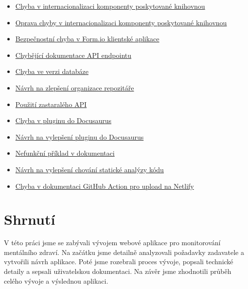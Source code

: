 \begin{itemize}
    \item
    \href{https://github.com/formio/react/issues/522}{Chyba v internacionalizaci komponenty poskytované knihovnou}
    \item
    \href{https://github.com/formio/react/pull/538}{Oprava chyby v internacionalizaci komponenty poskytované knihovnou}
    \item
    \href{https://github.com/formio/formio-app-formio/issues/35}{Bezpečnostní chyba v Form.io klientské aplikace}
    \item
    \href{https://github.com/formio/formio/issues/1555}{Chybějící dokumentace API endpointu}
    \item
    \href{https://github.com/formio/formio/issues/1485}{Chyba ve verzi databáze}
    \item
    \href{https://github.com/formio/formio-app-formio/issues/34}{Návrh na zlepšení organizace repozitáře}
    \item
    \href{https://github.com/formio/react/issues/523}{Použití zastaralého API}
    \item
    \href{https://github.com/tgreyuk/typedoc-plugin-markdown/issues/429}{Chyba v pluginu do Docusaurus}
    \item
    \href{https://github.com/tgreyuk/typedoc-plugin-markdown/issues/440}{Návrh na vylepšení pluginu do Docusaurus}
    \item
    \href{https://github.com/react-bootstrap/react-bootstrap/issues/6671}{Nefunkční příklad v dokumentaci}
    \item
    \href{https://github.com/gajus/eslint-plugin-jsdoc/issues/1138}{Návrh na vylepšení chování statické analýzy kódu}
    \item
    \href{https://github.com/MrFlynn/upload-to-netlify-action/issues/17}{Chyba v dokumentaci GitHub Action pro upload na Netlify}
\end{itemize}


\section{Shrnutí}\label{sec:shrnuti}

V této práci jsme se zabývali vývojem webové aplikace pro monitorování mentálního zdraví.
Na začátku jsme detailně analyzovali požadavky zadavatele a vytvořili návrh aplikace.
Poté jsme rozebrali proces vývoje, popsali technické detaily a sepsali uživatelskou dokumentaci.
Na závěr jsme zhodnotili průběh celého vývoje a výslednou aplikaci.